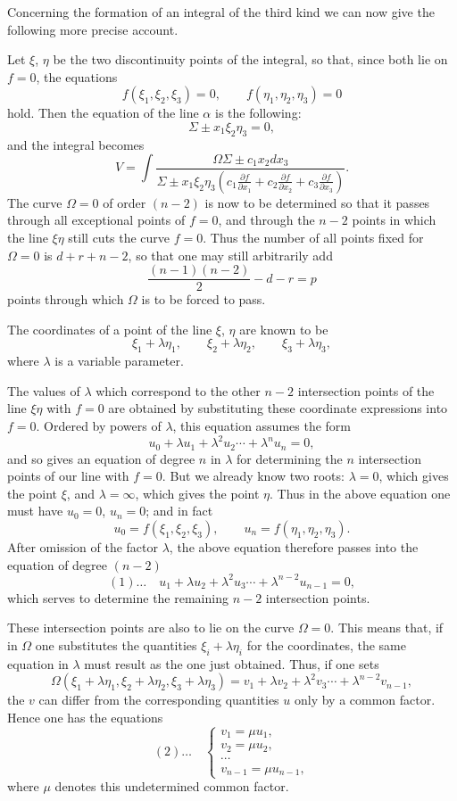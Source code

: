 \documentclass[10pt]{article}
\begin{document}
Concerning the formation of an integral of the third kind we can now give the following more precise account.

Let $\xi$, $\eta$ be the two discontinuity points of the integral, so that, since both lie on $f=0$, the equations
\[
f(\xi_1,\xi_2,\xi_3)=0,
\qquad
f(\eta_1,\eta_2,\eta_3)=0
\]
hold. Then the equation of the line $\alpha$ is the following:
\[
\Sigma\pm x_1\xi_2\eta_3=0,
\]
and the integral becomes
\[
V=\int\frac{\Omega\Sigma\pm c_1x_2dx_3}{\Sigma\pm x_1\xi_2\eta_3\left(c_1\frac{\partial f}{\partial x_1}+c_2\frac{\partial f}{\partial x_2}+c_3\frac{\partial f}{\partial x_3}\right)}.
\]
The curve $\Omega=0$ of order $(n-2)$ is now to be determined so that it passes through all exceptional points of $f=0$, and through the $n-2$ points in which the line $\xi\eta$ still cuts the curve $f=0$. Thus the number of all points fixed for $\Omega=0$ is $d+r+n-2$, so that one may still arbitrarily add
\[
\frac{(n-1)(n-2)}{2}-d-r=p
\]
points through which $\Omega$ is to be forced to pass.

The coordinates of a point of the line $\xi$, $\eta$ are known to be
\[
\xi_1+\lambda\eta_1,
\qquad
\xi_2+\lambda\eta_2,
\qquad
\xi_3+\lambda\eta_3,
\]
where $\lambda$ is a variable parameter.

The values of $\lambda$ which correspond to the other $n-2$ intersection points of the line $\xi\eta$ with $f=0$ are obtained by substituting these coordinate expressions into $f=0$. Ordered by powers of $\lambda$, this equation assumes the form
\[
u_0+\lambda u_1+\lambda^2u_2\cdots+\lambda^nu_n=0,
\]
and so gives an equation of degree $n$ in $\lambda$ for determining the $n$ intersection points of our line with $f=0$. But we already know two roots: $\lambda=0$, which gives the point $\xi$, and $\lambda=\infty$, which gives the point $\eta$. Thus in the above equation one must have $u_0=0$, $u_n=0$; and in fact
\[
u_0=f(\xi_1,\xi_2,\xi_3),
\qquad
u_n=f(\eta_1,\eta_2,\eta_3).
\]
After omission of the factor $\lambda$, the above equation therefore passes into the equation of degree $(n-2)$
\[
(1)\ldots\quad u_1+\lambda u_2+\lambda^2u_3\cdots+\lambda^{n-2}u_{n-1}=0,
\]
which serves to determine the remaining $n-2$ intersection points.

These intersection points are also to lie on the curve $\Omega=0$. This means that, if in $\Omega$ one substitutes the quantities $\xi_i+\lambda\eta_i$ for the coordinates, the same equation in $\lambda$ must result as the one just obtained. Thus, if one sets
\[
\Omega(\xi_1+\lambda\eta_1,\xi_2+\lambda\eta_2,\xi_3+\lambda\eta_3)
=v_1+\lambda v_2+\lambda^2v_3\cdots+\lambda^{n-2}v_{n-1},
\]
the $v$ can differ from the corresponding quantities $u$ only by a common factor. Hence one has the equations
\[
(2)\ldots\quad
\begin{cases}
 v_1=\mu u_1,\\
 v_2=\mu u_2,\\
 \cdots\\
 v_{n-1}=\mu u_{n-1},
\end{cases}
\]
where $\mu$ denotes this undetermined common factor.
\end{document}
